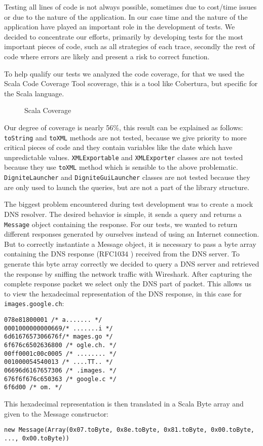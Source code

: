\documentclass[
	a4paper,					10pt,							twoside,					openright,				notitlepage,			parskip=half,			]{scrreprt}
\begin{document}
Testing all lines of code is not always possible, sometimes due to cost/time issues or due to the nature of the application.
In our case time and the nature of the application have played an important role in the development of tests.
We decided to concentrate our efforts, primarily by developing tests for the most important pieces of code, 
such as all strategies of each trace, secondly the rest of code where errors are likely and present a risk to correct
function.

To help qualify our tests we analyzed the code coverage, for that we used the Scala Code Coverage Tool scoverage,
this is a tool like Cobertura, but specific for the Scala language.

\begin{figure}[H] 
\caption{Scala Coverage}
\label{fig:scoverage}
\end{figure}

\newpage
Our degree of coverage is nearly 56\%, this result can be explained as follows:
\verb|toString| and \verb|toXML| methods are not tested, because we give priority to more critical pieces of code and they 
contain variables like the date which have unpredictable values.
\verb|XMLExportable| and  \verb|XMLExporter| classes are not tested because they use \verb|toXML| method which is sensible 
to the above problematic. \verb|DigniteLauncher| and  \verb|DigniteGuiLauncher| classes are not tested because they are only 
used to launch the queries, but are not a part of the library structure.

The biggest problem encountered during test development was to create a mock \gls{DNS} resolver. The desired behavior is simple, 
it sends a query and returns a \verb|Message| object containing the response.
For our tests, we wanted to return different responses generated by ourselves instead of using an Internet connection.
But to correctly instantiate a Message object, it is necessary to pass a byte array containing the \gls{DNS} response (RFC1034 
\cite{page:rfc1034}) received from the \gls{DNS} server. 
To generate this byte array correctly we decided to query a \gls{DNS} server and retrieved the response by sniffing the network
traffic with Wireshark. After capturing the complete response packet we select only the \gls{DNS} part of packet. This allows us 
to view the hexadecimal representation of the \gls{DNS} response, in this case for \verb|images.google.ch|:
\begin{lstlisting}
078e81800001 /* a....... */
0001000000000669/* .......i */
6d6167657306676f/* mages.go */
6f676c6502636800 /* ogle.ch. */
00ff0001c00c0005 /* ........ */
001000054540013 /* ....TT.. */
06696d6167657306 /* .images. */
676f6f676c650363 /* google.c */
6f6d00 /* om. */
\end{lstlisting}
This hexadecimal representation is then translated in a Scala Byte array and given to the Message constructor:
\begin{lstlisting}
new Message(Array(0x07.toByte, 0x8e.toByte, 0x81.toByte, 0x00.toByte, ..., 0x00.toByte))
\end{lstlisting}
\end{document}
